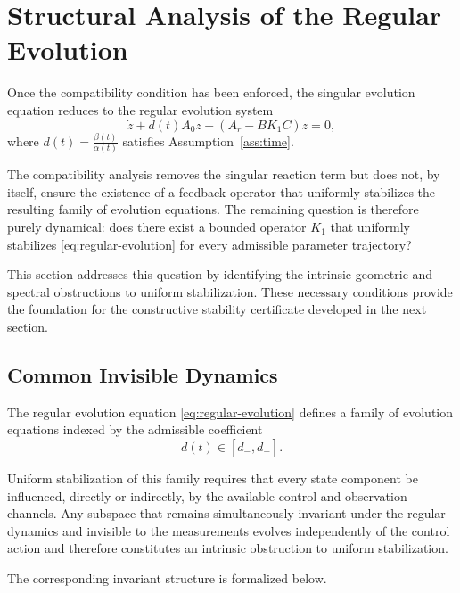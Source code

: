 \documentclass[pdflatex,sn-mathphys-num]{sn-jnl}
\theoremstyle{thmstyleone}%
\theoremstyle{thmstyletwo}%
\theoremstyle{thmstylethree}%
\begin{document}
\section{Structural Analysis of the Regular Evolution}
\label{sec:regular-evolution}

Once the compatibility condition has been enforced, the singular evolution equation reduces to the regular evolution system
\begin{equation}
\dot z
+
d(t)A_{0}z
+
\left(
A_{r}-BK_{1}C
\right)z
=
0,
\label{eq:regular-evolution}
\end{equation}
where \(d(t)=\frac{\beta(t)}{\alpha(t)}\)
satisfies Assumption~\ref{ass:time}.

The compatibility analysis removes the singular reaction term but does not, by itself, ensure the existence of a feedback operator that uniformly stabilizes the resulting family of evolution equations. The remaining question is therefore purely dynamical: does there exist a bounded operator \(K_{1}\) that uniformly stabilizes \eqref{eq:regular-evolution} for every admissible parameter trajectory?

This section addresses this question by identifying the intrinsic geometric and spectral obstructions to uniform stabilization. These necessary conditions provide the foundation for the constructive
stability certificate developed in the next section.

\subsection{Common Invisible Dynamics}
\label{subsec:necessary-conditions}

The regular evolution equation
\eqref{eq:regular-evolution} defines a family of evolution equations indexed by the admissible coefficient
\[
d(t)\in[d_-,d_+].
\]

Uniform stabilization of this family requires that every state component be influenced, directly or indirectly, by the available control and observation channels. Any subspace that remains simultaneously invariant under the regular dynamics and invisible to the measurements evolves independently of the control action and therefore constitutes an intrinsic obstruction to uniform stabilization.

The corresponding invariant structure is formalized below.
\end{document}
